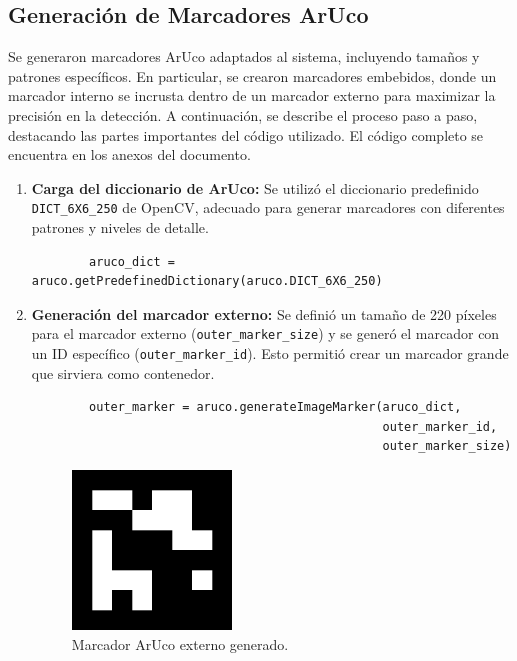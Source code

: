     
\subsection{Generación de Marcadores ArUco} 
    Se generaron marcadores ArUco adaptados al sistema, incluyendo tamaños y patrones específicos. En particular, se crearon marcadores embebidos, donde un marcador interno se incrusta dentro de un marcador externo para maximizar la precisión en la detección. A continuación, se describe el proceso paso a paso, destacando las partes importantes del código utilizado. El código completo se encuentra en los anexos del documento.
    
    \begin{enumerate}
        \item \textbf{Carga del diccionario de ArUco:} 
        Se utilizó el diccionario predefinido \texttt{DICT\_6X6\_250} de OpenCV, adecuado para generar marcadores con diferentes patrones y niveles de detalle.
        \begin{verbatim}
        aruco_dict = aruco.getPredefinedDictionary(aruco.DICT_6X6_250)
        \end{verbatim}
    
        \item \textbf{Generación del marcador externo:} 
        Se definió un tamaño de 220 píxeles para el marcador externo (\texttt{outer\_marker\_size}) y se generó el marcador con un ID específico (\texttt{outer\_marker\_id}). Esto permitió crear un marcador grande que sirviera como contenedor.
        \begin{verbatim}
        outer_marker = aruco.generateImageMarker(aruco_dict, 
                                                 outer_marker_id, 
                                                 outer_marker_size)
        \end{verbatim}
        \begin{center}
            \begin{figure}[h!]
                \centering
                \includegraphics[width=0.4\textwidth]{pictures/aruco_marker_5.png}
                \caption{Marcador ArUco externo generado.}
            \end{figure}
        \end{center}
    

\end{enumerate}
